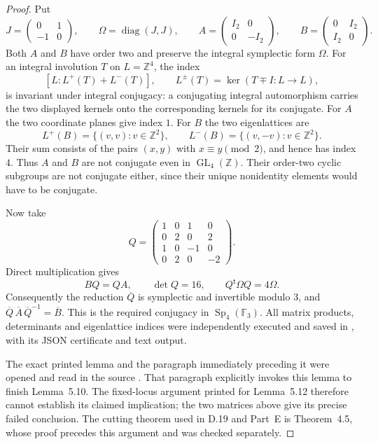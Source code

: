 \begin{proof}
Put
\[
 J=\begin{pmatrix}0&1\\-1&0\end{pmatrix},\qquad
 \Omega=\operatorname{diag}(J,J),\qquad
 A=\begin{pmatrix}I_2&0\\0&-I_2\end{pmatrix},\qquad
 B=\begin{pmatrix}0&I_2\\I_2&0\end{pmatrix}.
\]
Both $A$ and $B$ have order two and preserve the integral
symplectic form $\Omega$.  For an integral involution $T$
on $L=\mathbb Z^4$, the index
\[
       [L:L^+(T)+L^-(T)],\qquad
       L^\pm(T)=\ker(T\mp I:L\to L),
\]
is invariant under integral conjugacy: a conjugating
integral automorphism carries the two displayed kernels
onto the corresponding kernels for its conjugate.
For $A$ the two coordinate planes give index $1$.
For $B$ the two eigenlattices are
\[
 L^+(B)=\{(v,v):v\in\mathbb Z^2\},\qquad
 L^-(B)=\{(v,-v):v\in\mathbb Z^2\}.
\]
Their sum consists of the pairs $(x,y)$ with
$x\equiv y\pmod2$, and hence has index $4$.
Thus $A$ and $B$ are not conjugate even in
$\operatorname{GL}_4(\mathbb Z)$.  Their order-two cyclic
subgroups are not conjugate either, since their unique
nonidentity elements would have to be conjugate.

Now take
\[
 Q=\begin{pmatrix}
 1&0&1&0\\
 0&2&0&2\\
 1&0&-1&0\\
 0&2&0&-2
 \end{pmatrix}.
\]
Direct multiplication gives
\[
       BQ=QA,\qquad \det Q=16,\qquad
       Q^{\mathsf t}\Omega Q=4\Omega.
\]
Consequently the reduction $\overline Q$ is symplectic
and invertible modulo $3$, and
$\overline Q\,\overline A\,\overline Q^{-1}=\overline B$.
This is the required conjugacy in
$\operatorname{Sp}_4(\mathbb F_3)$.
All matrix products, determinants and eigenlattice
indices were independently executed and saved in
, with its JSON
certificate and text output.

The exact printed lemma and the paragraph immediately
preceding it were opened and read in the source
\cite[p.~26]{ET_Boggi2014}.  That paragraph explicitly
invokes this lemma to finish Lemma~5.10.  The fixed-locus
argument printed for Lemma~5.12 therefore cannot establish
its claimed implication; the two matrices above give
its precise failed conclusion.  The cutting theorem
used in D.19 and Part~E is Theorem~4.5, whose proof
precedes this argument and was checked separately.
\end{proof}
